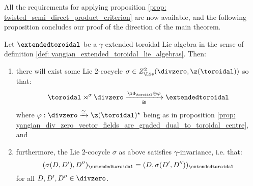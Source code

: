         All the requirements for applying proposition \ref{prop: twisted_semi_direct_product_criterion} are now available, and the following proposition concludes our proof of the  direction of the main theorem.
        \begin{proposition} \label{prop: yangian_extended_toroidal_lie_algebras_are_twisted_semi_direct_products}
            Let $\extendedtoroidal$ be a $\gamma$-extended toroidal Lie algebra in the sense of definition \ref{def: yangian_extended_toroidal_lie_algebras}. Then:
            \begin{enumerate}
                \item there will exist some Lie $2$-cocycle $\sigma \in Z^2_{\Lie}(\divzero, \z(\toroidal))$ so that:
                    $$\toroidal \rtimes^{\sigma} \divzero \xrightarrow[\cong]{\id_{\toroidal} \oplus \varphi} \extendedtoroidal$$
                where $\varphi: \divzero \xrightarrow[]{\cong} \z(\toroidal)^{\star}$ being as in proposition \ref{prop: yangian_div_zero_vector_fields_are_graded_dual_to_toroidal_centre}, and
                \item furthermore, the Lie $2$-cocycle $\sigma$ as above satisfies $\gamma$-invariance, i.e. that:
                    $$(\sigma(D, D'), D'')_{\extendedtoroidal} = (D, \sigma(D', D''))_{\extendedtoroidal}$$
                for all $D, D', D'' \in \divzero$.
            \end{enumerate}
        \end{proposition}
